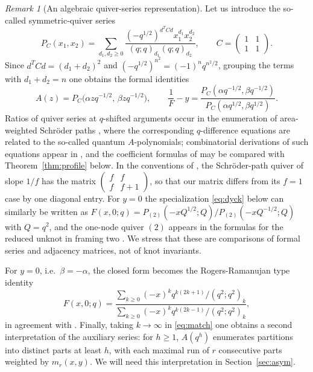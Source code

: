 \documentclass[11pt,reqno]{amsart}
\numberwithin{equation}{section}
\theoremstyle{remark}
\newtheorem{remark}[theorem]{Remark}
\begin{document}
\begin{remark}[An algebraic quiver-series representation]\label{rem:quiver}
Let us introduce the so-called symmetric-quiver series
\[
P_C(x_1,x_2)=\sum_{d_1,d_2\ge0}
\frac{(-q^{1/2})^{d^TCd}x_1^{d_1}x_2^{d_2}}
{(q;q)_{d_1}(q;q)_{d_2}},\qquad
C=\begin{pmatrix}1&1\\1&1\end{pmatrix}.
\]
Since $d^TCd=(d_1+d_2)^2$ and $(-q^{1/2})^{n^2}=(-1)^nq^{n^2/2}$, grouping the terms with
$d_1+d_2=n$ one obtains the formal identities
\begin{equation}\label{eq:quiver}
A(z)=P_C\big(\alpha zq^{-1/2},\,\beta zq^{-1/2}\big),\qquad
\frac1F-y=\frac{P_C(\alpha q^{-1/2},\beta q^{-1/2})}{P_C(\alpha q^{1/2},\beta q^{1/2})}.
\end{equation}
Ratios of quiver series at $q$-shifted arguments occur in the enumeration of
area-weighted Schr\"oder paths \cite{PSS18,SS25}, where the corresponding $q$-difference
equations are related to the so-called quantum $A$-polynomials; combinatorial derivations
of such equations appear in \cite{JTY24}, and the coefficient formulas of \cite{DS24} may
be compared with Theorem~\ref{thm:profile} below. In the conventions of \cite{SS25}, the
Schr\"oder-path quiver of slope $1/f$ has the matrix
$\left(\begin{smallmatrix}f&f\\f&f+1\end{smallmatrix}\right)$, so that our matrix differs
from its $f=1$ case by one diagonal entry. For $y=0$ the specialization \eqref{eq:dyck}
below can similarly be written as $F(x,0;q)=P_{(2)}(-xQ^{1/2};Q)/P_{(2)}(-xQ^{-1/2};Q)$
with $Q=q^2$, and the one-node quiver $(2)$ appears in the formulas for the reduced
unknot in framing two \cite{SS25}. We stress that these are comparisons of formal series
and adjacency matrices, not of knot invariants.
\end{remark}

For $y=0$, i.e.\ $\beta=-\alpha$, the closed form becomes the Rogers-Ramanujan type
identity
\begin{equation}\label{eq:dyck}
F(x,0;q)=\frac{\sum_{k\ge0}(-x)^kq^{k(2k+1)}/(q^2;q^2)_k}{\sum_{k\ge0}(-x)^kq^{k(2k-1)}/(q^2;q^2)_k},
\end{equation}
in agreement with \cite{OP12,FS09}. Finally, taking $k\to\infty$ in \eqref{eq:match} one
obtains a second interpretation of the auxiliary series: for $h\ge1$, $A(q^h)$ enumerates
partitions into distinct parts at least $h$, with each maximal run of $r$ consecutive
parts weighted by $m_r(x,y)$. We will need this interpretation in Section~\ref{sec:asym}.
\end{document}
